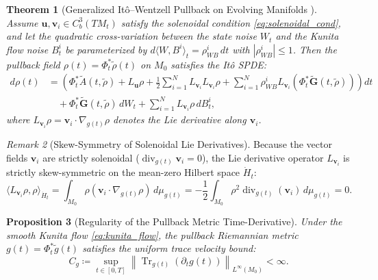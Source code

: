 \documentclass[11pt,a4paper,reqno]{article}
\def\mathrm#1{#1}%
\def\mathcal#1{#1}%
\DeclareMathOperator{\Tr}{Tr}
\theoremstyle{plain}
\newtheorem{theorem}{Theorem}[section]
\newtheorem{proposition}[theorem]{Proposition}
\theoremstyle{definition}
\theoremstyle{remark}
\newtheorem{remark}[theorem]{Remark}
\numberwithin{equation}{section}
\begin{document}
\begin{theorem}[Generalized It\^o--Wentzell Pullback on Evolving Manifolds \cite{ananda2026stochastic_fluid_v2, krylov2011ito}]\label{thm:ito_wentzell}
Assume $\mathbf{u}, \mathbf{v}_i \in C_b^3(T\mathcal{M}_t)$ satisfy the solenoidal condition \eqref{eq:solenoidal_cond}, and let the quadratic cross-variation between the state noise $W_t$ and the Kunita flow noise $B_t^i$ be parameterized by $\mathrm{d}\langle W, B^i \rangle_t = \rho_{WB}^i\,\mathrm{d}t$ with $|\rho_{WB}^i| \le 1$. Then the pullback field $\rho(t) = \Phi_t^*\tilde{\rho}(t)$ on $\mathcal{M}_0$ satisfies the It\^o SPDE:
\begin{align}\label{eq:ito_wentzell_pullback}
  \mathrm{d}\rho(t) &= \left( \Phi_t^* \tilde{A}(t, \tilde{\rho}) + \mathcal{L}_{\mathbf{u}} \rho + \frac{1}{2} \sum_{i=1}^N \mathcal{L}_{\mathbf{v}_i} \mathcal{L}_{\mathbf{v}_i} \rho + \sum_{i=1}^N \rho_{WB}^i \mathcal{L}_{\mathbf{v}_i} \left(\Phi_t^* \tilde{\mathbf{G}}(t, \tilde{\rho})\right) \right) \mathrm{d}t \nonumber \\
  &\quad + \Phi_t^* \tilde{\mathbf{G}}(t, \tilde{\rho})\,\mathrm{d}W_t + \sum_{i=1}^N \mathcal{L}_{\mathbf{v}_i} \rho \,\mathrm{d}B_t^i,
\end{align}
where $\mathcal{L}_{\mathbf{v}_i}\rho = \mathbf{v}_i \cdot \nabla_{g(t)}\rho$ denotes the Lie derivative along $\mathbf{v}_i$.
\end{theorem}

\begin{remark}[Skew-Symmetry of Solenoidal Lie Derivatives]\label{rem:skew_symmetry}
Because the vector fields $\mathbf{v}_i$ are strictly solenoidal ($\operatorname{div}_{g(t)} \mathbf{v}_i = 0$), the Lie derivative operator $\mathcal{L}_{\mathbf{v}_i}$ is strictly skew-symmetric on the mean-zero Hilbert space $\dot{H}_t$:
\begin{equation}\label{eq:skew_symmetry}
  \langle \mathcal{L}_{\mathbf{v}_i} \rho, \rho \rangle_{\dot{H}_t}
  = \int_{\mathcal{M}_0} \rho (\mathbf{v}_i \cdot \nabla_{g(t)} \rho) \,\mathrm{d}\mu_{g(t)}
  = -\frac{1}{2} \int_{\mathcal{M}_0} \rho^2 \operatorname{div}_{g(t)}(\mathbf{v}_i) \,\mathrm{d}\mu_{g(t)} = 0.
\end{equation}
\end{remark}

\begin{proposition}[Regularity of the Pullback Metric Time-Derivative]\label{prop:metric_trace_bound}
Under the smooth Kunita flow \eqref{eq:kunita_flow}, the pullback Riemannian metric $g(t) = \Phi_t^*\tilde{g}(t)$ satisfies the uniform trace velocity bound:
\begin{equation}\label{eq:metric_cg_bound}
  C_g \coloneqq \sup_{t \in [0,T]} \left\| \Tr_{g(t)}\!\left(\partial_t g(t)\right) \right\|_{L^\infty(\mathcal{M}_0)} < \infty.
\end{equation}
\end{proposition}
\end{document}
